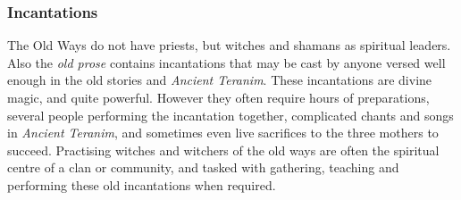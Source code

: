 \subsubsection{Incantations}

The Old Ways do not have priests, but witches and shamans as spiritual
leaders. Also the \emph{old prose} contains incantations that may be cast by
anyone versed well enough in the old stories and \emph{Ancient Teranim}. These
incantations are divine magic, and quite powerful. However they often require
hours of preparations, several people performing the incantation together,
complicated chants and songs in \emph{Ancient Teranim}, and sometimes even
live sacrifices to the three mothers to succeed. Practising witches and
witchers of the old ways are often the spiritual centre of a clan or
community, and tasked with gathering, teaching and performing these old
incantations when required.
